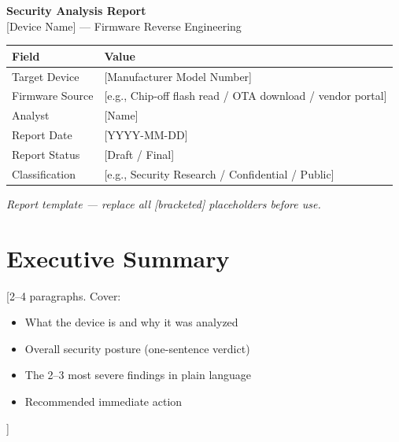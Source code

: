 \documentclass[12pt,a4paper]{article}
\begin{document}
\begin{titlepage}
  \centering
  \vspace*{2cm}

  {\Huge\bfseries Security Analysis Report}\\[0.5em]
  {\Large [Device Name] — Firmware Reverse Engineering}\\[3cm]

  \begin{tabular}{ll}
    \toprule
    \textbf{Field}           & \textbf{Value} \\
    \midrule
    Target Device            & [Manufacturer Model Number] \\
    Firmware Source          & [e.g., Chip-off flash read / OTA download / vendor portal] \\
    Analyst                  & [Name] \\
    Report Date              & [YYYY-MM-DD] \\
    Report Status            & [Draft / Final] \\
    Classification           & [e.g., Security Research / Confidential / Public] \\
    \bottomrule
  \end{tabular}

  \vfill
  {\small\textit{Report template — replace all [bracketed] placeholders before use.}}
\end{titlepage}

\newpage

\tableofcontents
\newpage

\section{Executive Summary}\label{sec:exec-summary}

[2–4 paragraphs. Cover:
\begin{itemize}
  \item What the device is and why it was analyzed
  \item Overall security posture (one-sentence verdict)
  \item The 2–3 most severe findings in plain language
  \item Recommended immediate action
\end{itemize}]
\end{document}
